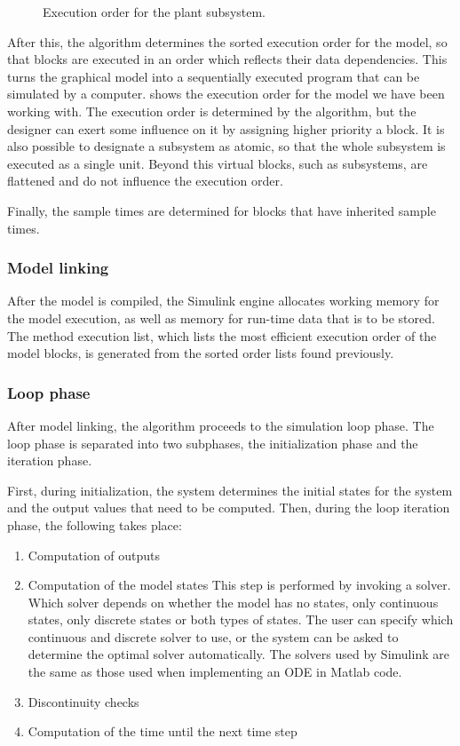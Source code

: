 \documentclass[\rootfolder/main.tex]{subfiles}
\begin{document}
\begin{figure}[ht]
    \caption{Execution order for the plant subsystem.\label{fig:simulink-inertial-order}}
\end{figure}

After this, the algorithm determines the sorted execution order for the model, so that blocks are executed in an order which reflects their data dependencies.
This turns the graphical model into a sequentially executed program that can be simulated by a computer.
 shows the execution order for the model we have been working with.
The execution order is determined by the algorithm, but the designer can exert some influence on it by assigning higher priority a block.
It is also possible to designate a subsystem as atomic, so that the whole subsystem is executed as a single unit.
Beyond this virtual blocks, such as subsystems, are flattened and do not influence the execution order.

Finally, the sample times are determined for blocks that have inherited sample times.

\subsubsection{Model linking}

After the model is compiled, the Simulink engine allocates working memory for the model execution, as well as memory for run-time data that is to be stored.
The method execution list, which lists the most efficient execution order of the model blocks, is generated from the sorted order lists found previously.

\subsubsection{Loop phase}

After model linking, the algorithm proceeds to the simulation loop phase.
The loop phase is separated into two subphases, the initialization phase and the iteration phase.

First, during initialization, the system determines the initial states for the system and the output values that need to be computed.
Then, during the loop iteration phase, the following takes place:

\begin{enumerate}
    \item Computation of outputs
    \item Computation of the model states
        This step is performed by invoking a solver.
        Which solver depends on whether the model has no states, only continuous states, only discrete states or both types of states.
        The user can specify which continuous and discrete solver to use, or the system can be asked to determine the optimal solver automatically.
        The solvers used by Simulink are the same as those used when implementing an ODE in Matlab code.
    \item Discontinuity checks
    \item Computation of the time until the next time step
\end{enumerate}
\end{document}
